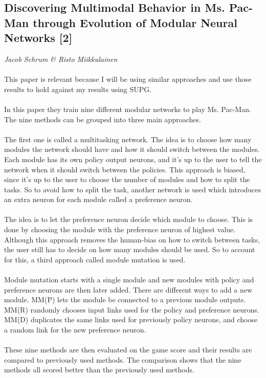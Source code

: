 \documentclass[11pt, a4paper]{article}
\begin{document}
\subsection{Discovering Multimodal Behavior in Ms. Pac-Man through Evolution of Modular Neural Networks [2]}
\textit{Jacob Schrum \& Risto Miikkulainen}
\\ \\
This paper is relevant because I will be using similar approaches and use those results to hold against my results using SUPG.
\\ \\
In this paper they train nine different modular networks to play Ms. Pac-Man. The nine methods can be grouped into three main approaches. 
\\ \\
The first one is called a multitasking network. The idea is to choose how many modules the network should have and how it should switch between the modules. Each module has its own policy output neurons, and it’s up to the user to tell the network when it should switch between the policies. This approach is biased, since it’s up to the user to choose the number of modules and how to split the tasks. So to avoid how to split the task, another network is used which introduces an extra neuron for each module called a preference neuron. 
\\ \\
The idea is to let the preference neuron decide which module to choose. This is done by choosing the module with the preference neuron of highest value. Although this approach removes the human-bias on how to switch between tasks, the user still has to decide on how many modules should be used. So to account for this, a third approach called module mutation is used.
\\ \\
Module mutation starts with a single module and new modules with policy and preference neurons are then later added. There are different ways to add a new module. MM(P) lets the module be connected to a previous module outputs. MM(R) randomly chooses input links used for the policy and preference neurons. MM(D) duplicates the same links used for previously policy neurons, and choose a random link for the new preference neuron.
\\ \\
These nine methods are then evaluated on the game score and their results are compared to previously used methods. The comparison shows that the nine methods all scored better than the previously used methods.
\end{document}
